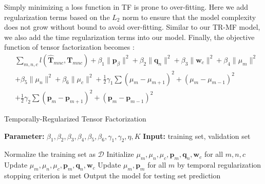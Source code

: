 Simply minimizing a loss function in TF is prone to over-fitting. Here we add regularization terms based on the $L_2$ norm to ensure that the model complexity does not grow without bound to avoid over-fitting.
Similar to our TR-MF model, we also add the time regularization terms into our model.
Finally, the objective function of tensor factorization becomes :\\
\begin{equation*}
\begin{aligned}
&\sum\limits_{m, n, c} l( \hat{\mathbf{T}}_{mnc}, \mathbf{T}_{mnc} )+\beta_1\|\mathbf{p}_{\beta}\|^2+\beta_2\|\mathbf{q}_n\|^2+\beta_3\|\mathbf{w}_c\|^2+\beta_4\|\mu_m\|^2\\
&+\beta_5\|\mu_n\|^2+\beta_6\|\mu_c\|^2+\frac{1}{2}\gamma_1\sum(\mu_m-\mu_{m+1})^2+(\mu_m-\mu_{m-1})^2
\\&
+\frac{1}{2}\gamma_2\sum(\mathbf{p}_m-\mathbf{p}_{m+1})^2+(\mathbf{p}_m-\mathbf{p}_{m-1})^2
\end{aligned}
\end{equation*}

\begin{algorithm}[h]
  \caption{Temporally-Regularized Tensor Factorization}
  \label{alg::conjugateGradient}
  \textbf{Parameter:} $\beta_1,\beta_2, \beta_3, \beta_4, \beta_5, \beta_6, \gamma_1, \gamma_2, \eta, K$
  \textbf{Input:} training set, validation set
  \begin{algorithmic}[1]
    \State Normalize the training set as $\mathcal{D}$
    \State Initialize $\mu_m, \mu_n, \mu_c, \mathbf{p}_m, \mathbf{q}_n, \mathbf{w}_c $ for all $m, n, c$
    \Repeat
     	 \State Update $\mu_m, \mu_n, \mu_c, \mathbf{p}_m, \mathbf{q}_n, \mathbf{w}_c$ 
      \EndFor
     \State Update $\mu_m, \mathbf{p}_m$ for all $m$ by temporal regularization
    \Until stopping criterion is met
    \State Output the model for testing set prediction 
  \end{algorithmic}
\end{algorithm}

